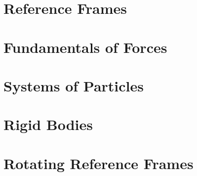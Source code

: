 \documentclass[british,11pt,a4paper]{report}
\begin{document}
\maketitle
\tableofcontents
\chapter{Reference Frames}
\label{chapRefFrames}

\chapter{Fundamentals of Forces}
\label{chapForces}

\chapter{Systems of Particles}
\label{chapSystems}

\chapter{Rigid Bodies}
\label{chapRigidBodies}

\chapter{Rotating Reference Frames}
\label{chapRotatingFrames}

\end{document}
